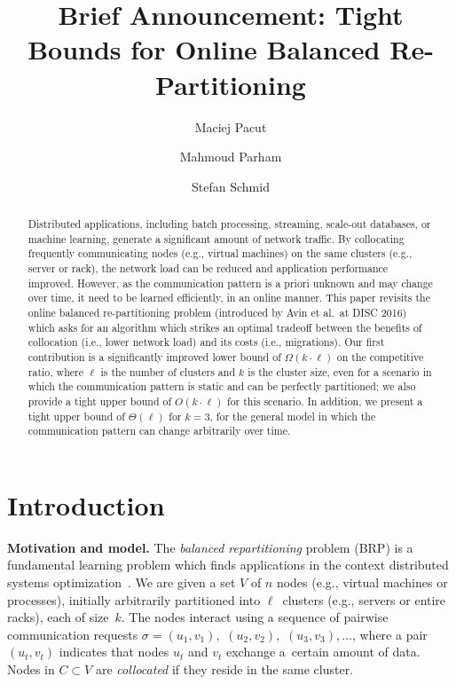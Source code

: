 \documentclass[manuscript,screen=true, review, anonymous]{acmart}
\title{Brief Announcement: Tight Bounds for Online Balanced Re-Partitioning}
\author{Maciej Pacut}
\affiliation{%
  \institution{Faculty of Computer Science, University of Vienna}
  \country{Austria}
}
\author{Mahmoud Parham}
\affiliation{%
  \institution{Faculty of Computer Science, University of Vienna}
  \country{Austria}
}
\author{Stefan Schmid}
\affiliation{%
  \institution{Faculty of Computer Science, University of Vienna}
  \country{Austria}
}
\newcommand{\OBRP}{BRP}
\begin{document}
\begin{abstract}
Distributed   applications,  including  batch  processing, streaming, scale-out databases,
or machine learning, generate a significant amount of network traffic. By collocating frequently communicating nodes (e.g., virtual machines) on the same clusters (e.g., server or rack), the network load can be reduced and application performance improved. 
However, as the communication pattern is a priori unknown and may change over time, it need to be learned efficiently, in an online manner.
%
This paper revisits the online 
balanced re-partitioning problem 
(introduced by Avin et al.~at DISC 2016)
which asks for an algorithm which strikes
an optimal tradeoff between the benefits
of collocation (i.e., lower network load) 
and its costs (i.e., migrations). 
%
Our first contribution is a significantly improved
lower bound of $\Omega(k\cdot \ell)$ on the
competitive ratio, where $\ell$ is the number
of clusters and $k$ is the cluster size,
even for a scenario in which the communication
pattern is static and can be perfectly partitioned;
we also provide a tight upper bound 
of $O(k\cdot \ell)$ for this scenario.
In addition, we present a tight upper bound
of $\Theta(\ell)$ for $k=3$,
for the general model in which the
communication pattern can change arbitrarily
over time. 
\end{abstract}
    
\maketitle
    
\renewcommand{\shortauthors}{M.~Pacut, M.~Parham, S.~Schmid}

\section{Introduction}

\noindent \textbf{Motivation and model.}
The \emph{balanced repartitioning} problem (\OBRP{})
is a fundamental learning problem
which finds applications in the context
distributed systems optimization~\cite{repartition-disc}. We are given a set $V$ of $n$ nodes 
(e.g., virtual machines or processes),
initially arbitrarily partitioned into $\ell$~clusters
(e.g., servers or entire racks),
each of size~$k$.
The nodes interact using
a sequence of pairwise communication requests
$\sigma = (u_1,v_1),$ $(u_2,v_2),$ $(u_3,v_3), \ldots$,
where a pair $(u_t,v_t)$ indicates that nodes $u_t$ and $v_t$ exchange a~certain amount of data.
Nodes in $C \subset V$ are \emph{collocated}
if they reside in the same cluster.
\end{document}
